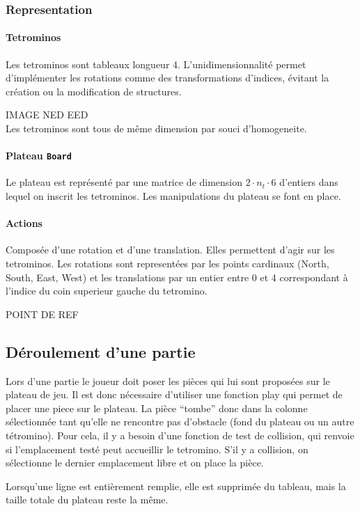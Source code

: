 \documentclass{article}
\begin{document}
\subsubsection{Representation}

\paragraph{Tetrominos}
Les tetrominos sont tableaux longueur 4. L'unidimensionnalit\'e permet
d'impl\'ementer les rotations comme des transformations d'indices, \'evitant la
cr\'eation ou la modification de structures.

IMAGE NED EED\\
Les tetrominos sont tous de même dimension par souci d'homogeneite.

\paragraph{Plateau \texttt{Board}}
Le plateau est repr\'esent\'e par une matrice de dimension
\(2\cdot n_t\cdot 6\) d'entiers dans lequel on inscrit les tetrominos. Les
manipulations du plateau se font en place.


\paragraph{Actions}
Composée d'une rotation et d'une translation. Elles permettent d'agir sur les
tetrominos. Les rotations sont representées par les points cardinaux
(North, South, East, West) et les translations par un entier entre 0 et 4
correspondant à l'indice du coin superieur gauche du tetromino.

POINT DE REF

\subsection{D\'eroulement d'une partie}
Lors d'une partie le joueur doit poser les pièces qui lui sont proposées sur
le plateau de jeu. Il est donc nécessaire d'utiliser une fonction play qui
permet de placer une piece sur le plateau. La pièce ``tombe'' donc dans la
colonne sélectionnée tant qu'elle ne rencontre pas d'obstacle (fond du plateau
ou un autre tétromino). Pour cela, il y a besoin d'une fonction de test de
collision, qui renvoie si l'emplacement testé peut accueillir le tetromino.
S'il y a collision, on sélectionne le dernier emplacement libre et on place la
pièce.

Lorsqu'une ligne est entièrement remplie, elle est supprimée du tableau, mais
la taille totale du plateau reste la même.
\end{document}
